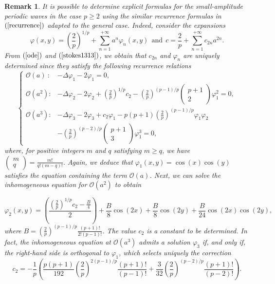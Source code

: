 \documentclass[12pt,reqno,a4paper]{amsart} %
\numberwithin{equation}{section}
\numberwithin{figure}{section}
\newtheorem{remark}[theorem]{Remark}
\begin{document}
\begin{remark}\label{expsol3} It is possible to determine explicit formulas for the small-amplitude periodic waves in the case $p \geq 2$ using the similar recurrence formulas in $(\ref{recurrence})$ adapted to the general case. Indeed, consider the expansions
		\begin{equation}\label{stokes1313}\varphi(x,y) =\left(\frac{2}{p}\right)^{1/p}+\sum_{n=1}^{+\infty}a^n\varphi_n(x,y)\ \ \mbox{and}\ \ c = \frac{2}{p}+ \sum_{n=1}^{+\infty}c_{2n}a^{2n}.\end{equation}
	From $(\ref{ode})$ and $(\ref{stokes1313})$, we obtain that $c_{2n}$ and $\varphi_n$ are uniquely determined since they satisfy the following recurrence relations
	\begin{equation}\label{recurrence11}\left\{\begin{array}{llllll}
			\mathcal{O}(a)\ :  &-\displaystyle\Delta\varphi_1-2\varphi_1=0,\\
			\mathcal{O}(a^2):  &-\displaystyle \Delta \varphi_2-2\varphi_2+\left(\frac{2}{p}\right)^{1/p}c_2-\left(\frac{2}{p}\right)^{(p-1)/p}
			\left(\begin{array}{cccc}p+1 \\ 2\end{array}\right)\varphi_1^2=0,\\
			\mathcal{O}(a^3): &-\displaystyle\Delta\varphi_3-2\varphi_3+c_2\varphi_1-	p(p+1)\left(\frac{2}{p}\right)^{(p-1)/p}\varphi_1\varphi_2\\
			&-\displaystyle\left(\frac{2}{p}\right)^{(p-2)/p}\left(\begin{array}{cccc}p+1 \\ 3\end{array}\right)\varphi_1^3=0,
		\end{array}\right.\end{equation}	
	where, for positive integers $m$ and $q$ satisfying $m\geq q$, we have $\left(\begin{array}{cccc}m \\ q\end{array}\right)=\frac{m!}{q!(m-q)!}$. Again, we deduce that $\varphi_1(x,y)=\cos(x)\cos(y)$ satisfies the equation containing the term $\mathcal{O}(a)$. Next, we can solve the inhomogeneous equation for $\mathcal{O}(a^2)$ to obtain

\begin{equation}\label{stokes212}\varphi_2(x,y)=\left( \frac{\left( \frac{2}{p} \right)^{1/p} c_2 - \frac{B}{4}}{2} \right) + \frac{B}{8} \cos(2x) + \frac{B}{8} \cos(2y) + \frac{B}{24} \cos(2x)\cos(2y),
\end{equation} 
where $B=\left( \frac{2}{p} \right)^{(p-1)/p}\frac{(p+1)!}{2!(p-1)!}$. The value $c_2$ is a constant to be determined. In fact, the inhomogeneous equation at $\mathcal{O}(a^3)$ admits a solution $\varphi_3$ if, and only if, the right-hand side is orthogonal to $\varphi_1$, which selects uniquely the
correction \begin{equation}\label{c21}c_2 = -\frac{1}{p} \left( \frac{p(p+1) }{192} \left( \frac{2}{p} \right)^{2(p-1)/p}\frac{(p+1)!}{(p-1)!}  + \frac{3}{32} \left( \frac{2}{p} \right)^{(p-2)/p}\frac{(p+1)!}{(p-2)!} \right).\end{equation}



\end{remark}
\end{document}
